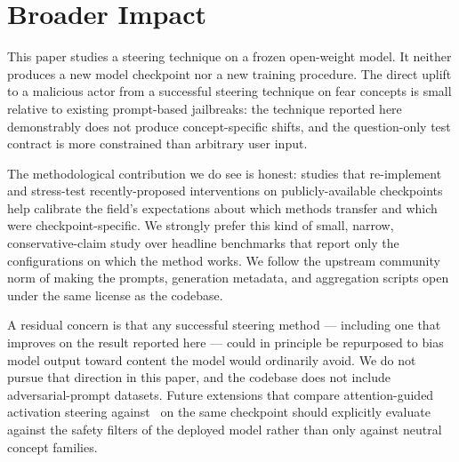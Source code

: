 \section{Broader Impact}
\label{sec:broader_impact}

This paper studies a steering technique on a frozen open-weight model. It
neither produces a new model checkpoint nor a new training procedure. The
direct uplift to a malicious actor from a successful steering technique on
fear concepts is small relative to existing prompt-based jailbreaks: the
technique reported here demonstrably does not produce concept-specific
shifts, and the question-only test contract is more constrained than
arbitrary user input.

The methodological contribution we do see is honest: studies that
re-implement and stress-test recently-proposed interventions on
publicly-available checkpoints help calibrate the field's expectations
about which methods transfer and which were checkpoint-specific. We
strongly prefer this kind of small, narrow, conservative-claim study
over headline benchmarks that report only the configurations on which
the method works. We follow the upstream community norm of making the
prompts, generation metadata, and aggregation scripts open under the
same license as the codebase.

A residual concern is that any successful steering method --- including
one that improves on the result reported here --- could in principle
be repurposed to bias model output toward content the model would
ordinarily avoid. We do not pursue that direction in this paper, and
the codebase does not include adversarial-prompt datasets. Future
extensions that compare attention-guided activation steering against
\steermoe~on the same checkpoint should explicitly evaluate against
the safety filters of the deployed model rather than only against
neutral concept families.
